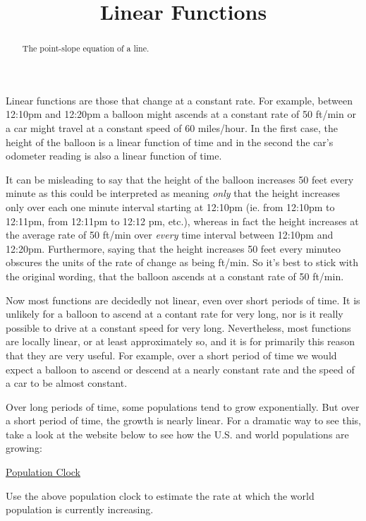 \documentclass{ximera}
\title{Linear Functions}
\begin{document}
\begin{abstract}
The point-slope equation of a line.
\end{abstract}
\maketitle

Linear functions are those that change at a constant rate. For example, between 12:10pm and 12:20pm a balloon might ascends at a constant rate of 50 ft/min or a car might travel at a constant speed of 60 miles/hour. In the first case, the height of the balloon is a linear function of time and in the second the car's odometer reading is also a linear function of time.

It can be misleading to say that the height of the balloon increases 50 feet every minute as this could be interpreted as meaning \emph{only} that the height increases only over each one minute interval starting at 12:10pm (ie. from 12:10pm to 12:11pm, from 12:11pm to 12:12 pm, etc.), whereas in fact the height increases at the average rate of 50 ft/min over \emph{every} time interval between 12:10pm and 12:20pm. Furthermore, saying that the height increases 50 feet every minuteo obscures the units of the rate of change as being ft/min. So it's best to stick with the original wording, that the balloon ascends at a constant rate of 50 ft/min.

Now most functions are decidedly not linear, even over short periods of time. It is unlikely for a balloon to ascend at a contant rate for very long, nor is it really possible to drive at a constant speed for very long. Nevertheless, most functions are locally linear, or at least approximately so, and it is for primarily this reason that they are very useful. For example, over a short period of time we would expect a balloon to ascend or descend at a nearly constant rate and the speed of a car to be almost constant. 

Over long periods of time, some populations tend to grow exponentially. But over a short period of time, the growth is nearly linear. For a dramatic way to see this, take a look at the website below to see how the U.S. and world populations are growing:

\href{https://www.census.gov/popclock/}{Population Clock}

\begin{question} \label{Q1:LF}
Use the above population clock to estimate the rate at which the world population is currently increasing.
\end{question}
\end{document}

